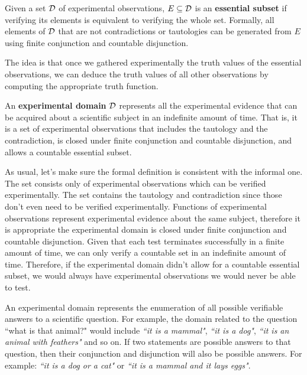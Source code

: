 \documentclass[11pt,letterpaper,fleqn]{memoir} %
\begin{document}
\begin{mathSection}
	\begin{defn}
		Given a set $\mathcal{D}$ of experimental observations, $E \subseteq \mathcal{D}$ is an \textbf{essential subset} if verifying its elements is equivalent to verifying the whole set. Formally, all elements of $\mathcal{D}$ that are not contradictions or tautologies can be generated from $E$ using finite conjunction and countable disjunction.
	\end{defn}
\end{mathSection}

The idea is that once we gathered experimentally the truth values of the essential observations, we can deduce the truth values of all other observations by computing the appropriate truth function.

\begin{mathSection}
\begin{defn}
	An \textbf{experimental domain} $\mathcal{D}$ represents all the experimental evidence that can be acquired about a scientific subject in an indefinite amount of time. That is, it is a set of experimental observations that includes the tautology and the contradiction, is closed under finite conjunction and countable disjunction, and allows a countable essential subset.
\end{defn}
\begin{justification}
	As usual, let's make sure the formal definition is consistent with the informal one. The set consists only of experimental observations which can be verified experimentally. The set contains the tautology and contradiction since those don't even need to be verified experimentally. Functions of experimental observations represent experimental evidence about the same subject, therefore it is appropriate the experimental domain is closed under finite conjunction and countable disjunction. Given that each test terminates successfully in a finite amount of time, we can only verify a countable set in an indefinite amount of time. Therefore, if the experimental domain didn't allow for a countable essential subset, we would always have experimental observations we would never be able to test.
\end{justification}
\end{mathSection}

An experimental domain represents the enumeration of all possible verifiable answers to a scientific question. For example, the domain related to the question ``what is that animal?" would include \emph{``it is a mammal"}, \emph{``it is a dog"}, \emph{``it is an animal with feathers"} and so on. If two statements are possible answers to that question, then their conjunction and disjunction will also be possible answers. For example: \emph{``it is a dog or a cat"} or \emph{``it is a mammal and it lays eggs"}.
\end{document}
